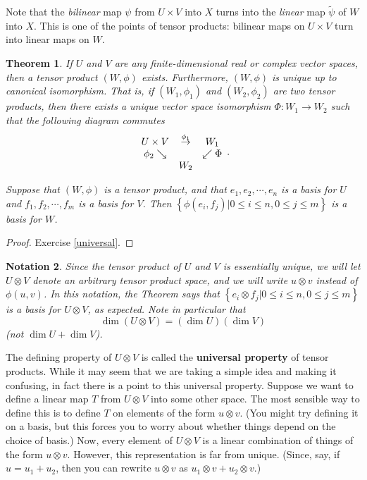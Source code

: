 \documentclass{amsbook}
\theoremstyle{plain}
\newtheorem{theorem}{Theorem}
\newtheorem{notation}[theorem]{Notation}
\numberwithin{equation}{chapter}
\numberwithin{theorem}{chapter}
\begin{document}
Note that the \textit{bilinear} map $\psi$ from $U\times V$ into $X$ turns
into the \textit{linear} map $\widetilde{\psi}$ of $W$ into $X$. This is one
of the points of tensor products: bilinear maps on $U\times V$ turn into
linear maps on $W$.

\begin{theorem}
\label{tensor.exist}If $U$ and $V$ are any finite-dimensional real or complex
vector spaces, then a tensor product $(W,\phi)$ exists. Furthermore,
$(W,\phi)$ is unique up to canonical isomorphism. That is, if $(W_{1},\phi
_{1})$ and $(W_{2},\phi_{2})$ are two tensor products, then there exists a
unique vector space isomorphism $\Phi:W_{1}\rightarrow W_{2}$ such that the
following diagram commutes
\[%
\begin{array}
[c]{ccc}%
U\times V & \overset{\phi_{1}}{\rightarrow} & W_{1}\\
\phi_{2}\searrow &  & \swarrow\Phi\\
&  W_{2} &
\end{array}
\text{.}%
\]

Suppose that $(W,\phi)$ is a tensor product, and that $e_{1},e_{2}%
,\cdots,e_{n}$ is a basis for $U$ and $f_{1},f_{2},\cdots,f_{m}$ is a basis
for $V$. Then $\left\{  \phi(e_{i},f_{j})\left|  0\leq i\leq n,0\leq j\leq
m\right.  \right\}  $ is a basis for $W$.
\end{theorem}

\begin{proof}
Exercise \ref{universal}.
\end{proof}

\begin{notation}
Since the tensor product of $U$ and $V$ is essentially unique, we will let
$U\otimes V$ denote an arbitrary tensor product space, and we will write
$u\otimes v$ instead of $\phi(u,v)$. In this notation, the Theorem says that
$\left\{  e_{i}\otimes f_{j}\left|  0\leq i\leq n,0\leq j\leq m\right.
\right\}  $ is a basis for $U\otimes V$, as expected. Note in particular that
\[
\dim\left(  U\otimes V\right)  =\left(  \dim U\right)  \left(  \dim V\right)
\]
(not $\dim U+\dim V$).
\end{notation}

The defining property of $U\otimes V$ is called the \textbf{universal
property} of tensor products. While it may seem that we are taking a simple
idea and making it confusing, in fact there is a point to this universal
property. Suppose we want to define a linear map $T$ from $U\otimes V$ into
some other space. The most sensible way to define this is to define $T$ on
elements of the form $u\otimes v$. (You might try defining it on a basis, but
this forces you to worry about whether things depend on the choice of basis.)
Now, every element of $U\otimes V$ is a linear combination of things of the
form $u\otimes v$. However, this representation is far from unique. (Since,
say, if $u=u_{1}+u_{2}$, then you can rewrite $u\otimes v$ as $u_{1}\otimes
v+u_{2}\otimes v$.)
\end{document}
